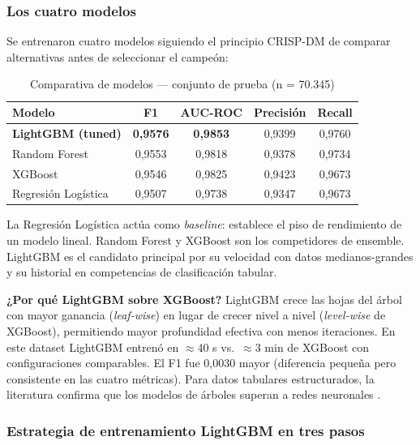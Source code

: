 \documentclass[12pt, a4paper]{article}
\begin{document}
\subsubsection{Los cuatro modelos}

Se entrenaron cuatro modelos siguiendo el principio CRISP-DM de comparar alternativas
antes de seleccionar el campeón:

\begin{table}[H]
\centering
\caption{Comparativa de modelos — conjunto de prueba (n = 70.345)}
\label{tab:modelos}
\begin{tabular}{lcccc}
\toprule
\textbf{Modelo} & \textbf{F1} & \textbf{AUC-ROC} & \textbf{Precisión} & \textbf{Recall} \\
\midrule
\rowcolor{azulDane!10}
\textbf{LightGBM (tuned)} & \textbf{0{,}9576} & \textbf{0{,}9853} & 0{,}9399 & 0{,}9760 \\
Random Forest & 0{,}9553 & 0{,}9818 & 0{,}9378 & 0{,}9734 \\
XGBoost & 0{,}9546 & 0{,}9825 & 0{,}9423 & 0{,}9673 \\
Regresión Logística & 0{,}9507 & 0{,}9738 & 0{,}9347 & 0{,}9673 \\
\bottomrule
\end{tabular}
\end{table}

La Regresión Logística actúa como \textit{baseline}: establece el piso de rendimiento
de un modelo lineal. Random Forest y XGBoost son los competidores de ensemble.
LightGBM es el candidato principal por su velocidad con datos medianos-grandes y su
historial en competencias de clasificación tabular.

\begin{decision}
\textbf{¿Por qué LightGBM sobre XGBoost?} LightGBM crece las hojas del árbol con mayor
ganancia (\textit{leaf-wise}) en lugar de crecer nivel a nivel (\textit{level-wise} de
XGBoost), permitiendo mayor profundidad efectiva con menos iteraciones. En este dataset
LightGBM entrenó en $\approx$40 s vs.\ $\approx$3 min de XGBoost con configuraciones
comparables. El F1 fue 0{,}0030 mayor (diferencia pequeña pero consistente en las cuatro
métricas). Para datos tabulares estructurados, la literatura confirma que los modelos
de árboles superan a redes neuronales \cite{grinsztajn2022}.
\end{decision}

\subsubsection{Estrategia de entrenamiento LightGBM en tres pasos}
\end{document}
